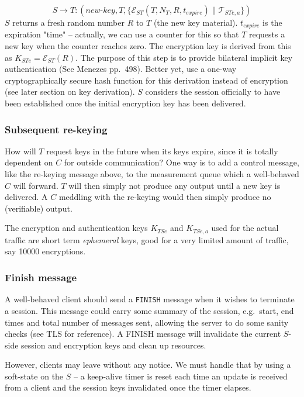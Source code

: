 \[
S \rightarrow T: (\textit{new-key},T, \{ \mathcal{E}_{ST}(T,N_T,R,t_{expire}) \parallel \mathcal{T}_{STe,a} \} )
\]
$S$ returns a fresh random number $R$ to $T$ (the new key material). $t_{expire}$ is the expiration "time" -- actually, we can use a counter for this so that $T$ requests a new key when the counter reaches zero. The encryption key is derived from this as $K_{STe}=\mathcal{E}_{ST}(R)$. The purpose of this step is to provide bilateral implicit key authentication (See Menezes pp.\ 498). Better yet, use a one-way cryptographically secure hash function for this derivation instead of encryption (see later section on key derivation). $S$ considers the session officially to have been established once the initial encryption key has been delivered.

\subsubsection{Subsequent re-keying}

How will $T$ request keys in the future when its keys expire, since it is totally dependent on $C$ for outside communication? One way is to add a control message, like the re-keying message above, to the measurement queue which a well-behaved $C$ will forward. $T$ will then simply not produce any output until a new key is delivered. A $C$ meddling with the re-keying would then simply produce no (verifiable) output.

The encryption and authentication keys $K_{TSe}$ and $K_{TSe,a}$ used for the actual traffic are short term \textit{ephemeral} keys, good for a very limited amount of traffic, say 10000 encryptions.

\subsubsection{Finish message}

A well-behaved client should send a \texttt{FINISH} message when it wishes to terminate a session. This message could carry some summary of the session, e.g.\ start, end times and total number of messages sent, allowing the server to do some sanity checks (see TLS for reference). A FINISH message will invalidate the current $S$-side session and encryption keys and clean up resources. 

However, clients may leave without any notice. We must handle that by using a soft-state on the $S$ -- a keep-alive timer is reset each time an update is received from a client and the session keys invalidated once the timer elapses.

